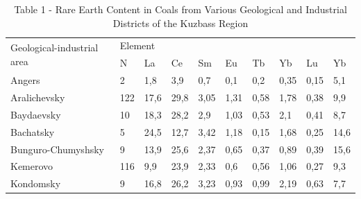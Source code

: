 \begin{table}[H]
\caption*{Table 1 - Rare Earth Content in Coals from Various Geological and Industrial Districts of the Kuzbass Region}
\centering
\begin{tabular}{|l|lllllllll|}
\hline
\multirow{2}{*}{Geological-industrial area} & \multicolumn{9}{l|}{Element} \\ \cline{2-10}
 & \multicolumn{1}{l|}{N} & \multicolumn{1}{l|}{La} & \multicolumn{1}{l|}{Ce} & \multicolumn{1}{l|}{Sm} & \multicolumn{1}{l|}{Eu} & \multicolumn{1}{l|}{Tb} & \multicolumn{1}{l|}{Yb} & \multicolumn{1}{l|}{Lu} & Yb \\ \hline
Angers & \multicolumn{1}{l|}{2} & \multicolumn{1}{l|}{1,8} & \multicolumn{1}{l|}{3,9} & \multicolumn{1}{l|}{0,7} & \multicolumn{1}{l|}{0,1} & \multicolumn{1}{l|}{0,2} & \multicolumn{1}{l|}{0,35} & \multicolumn{1}{l|}{0,15} & 5,1 \\ \hline
Aralichevsky & \multicolumn{1}{l|}{122} & \multicolumn{1}{l|}{17,6} & \multicolumn{1}{l|}{29,8} & \multicolumn{1}{l|}{3,05} & \multicolumn{1}{l|}{1,31} & \multicolumn{1}{l|}{0,58} & \multicolumn{1}{l|}{1,78} & \multicolumn{1}{l|}{0,38} & 9,9 \\ \hline
Baydaevsky & \multicolumn{1}{l|}{10} & \multicolumn{1}{l|}{18,3} & \multicolumn{1}{l|}{28,2} & \multicolumn{1}{l|}{2,9} & \multicolumn{1}{l|}{1,03} & \multicolumn{1}{l|}{0,53} & \multicolumn{1}{l|}{2,1} & \multicolumn{1}{l|}{0,41} & 8,7 \\ \hline
Bachatsky & \multicolumn{1}{l|}{5} & \multicolumn{1}{l|}{24,5} & \multicolumn{1}{l|}{12,7} & \multicolumn{1}{l|}{3,42} & \multicolumn{1}{l|}{1,18} & \multicolumn{1}{l|}{0,15} & \multicolumn{1}{l|}{1,68} & \multicolumn{1}{l|}{0,25} & 14,6 \\ \hline
Bunguro-Chumyshsky & \multicolumn{1}{l|}{9} & \multicolumn{1}{l|}{13,9} & \multicolumn{1}{l|}{25,6} & \multicolumn{1}{l|}{2,37} & \multicolumn{1}{l|}{0,65} & \multicolumn{1}{l|}{0,37} & \multicolumn{1}{l|}{0,89} & \multicolumn{1}{l|}{0,39} & 15,6 \\ \hline
Kemerovo & \multicolumn{1}{l|}{116} & \multicolumn{1}{l|}{9,9} & \multicolumn{1}{l|}{23,9} & \multicolumn{1}{l|}{2,33} & \multicolumn{1}{l|}{0,6} & \multicolumn{1}{l|}{0,56} & \multicolumn{1}{l|}{1,06} & \multicolumn{1}{l|}{0,27} & 9,3 \\ \hline
Kondomsky & \multicolumn{1}{l|}{9} & \multicolumn{1}{l|}{16,8} & \multicolumn{1}{l|}{26,2} & \multicolumn{1}{l|}{3,23} & \multicolumn{1}{l|}{0,93} & \multicolumn{1}{l|}{0,99} & \multicolumn{1}{l|}{2,19} & \multicolumn{1}{l|}{0,63} & 7,7 \\ \hline

\end{tabular}
\end{table}
